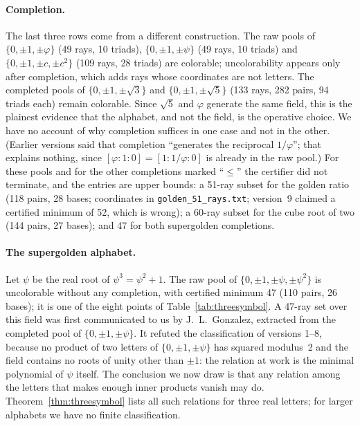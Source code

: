 \paragraph{Completion.}  The last three rows come from a different construction.  The raw pools
of $\{0,\pm1,\pm\varphi\}$ (49 rays, 10 triads), $\{0,\pm1,\pm\psi\}$ (49 rays, 10 triads) and
$\{0,\pm1,\pm c,\pm c^2\}$ (109 rays, 28 triads) are colorable; uncolorability appears only
after completion, which adds rays whose coordinates are not letters.  The completed pools of
$\{0,\pm1,\pm\sqrt3\}$ and $\{0,\pm1,\pm\sqrt5\}$ (133 rays, 282 pairs, 94 triads each) remain
colorable.  Since $\sqrt5$ and $\varphi$ generate the same field, this is the plainest evidence
that the alphabet, and not the field, is the operative choice.  We have no account of why
completion suffices in one case and not in the other.  (Earlier versions said that completion
``generates the reciprocal $1/\varphi$''; that explains nothing, since
$[\varphi:1:0]=[1:1/\varphi:0]$ is already in the raw pool.)  For these pools and for the other
completions marked ``$\le$'' the certifier did not terminate, and the entries are upper bounds:
a 51-ray subset for the golden ratio (118 pairs, 28 bases; coordinates in
\texttt{golden\_51\_rays.txt}; version~9 claimed a certified minimum of 52, which is wrong); a
60-ray subset for the cube root of two (144 pairs, 27 bases); and 47 for both supergolden
completions.

\paragraph{The supergolden alphabet.}  Let $\psi$ be the real root of $\psi^3=\psi^2+1$.  The
raw pool of $\{0,\pm1,\pm\psi,\pm\psi^2\}$ is uncolorable without any completion, with certified
minimum 47 (110 pairs, 26 bases); it is one of the eight points of Table~\ref{tab:threesymbol}.
A 47-ray set over this field was first communicated to us by J.~L.~Gonzalez, extracted from the
completed pool of $\{0,\pm1,\pm\psi\}$.  It refuted the classification of versions 1--8, because
no product of two letters of $\{0,\pm1,\pm\psi\}$ has squared modulus~2 and the field contains no roots of unity other
than $\pm1$: the relation at work is the minimal polynomial of $\psi$ itself.  The conclusion we
now draw is that any relation among the letters that makes enough inner products vanish may do.
Theorem~\ref{thm:threesymbol} lists all such relations for three real letters; for larger
alphabets we have no finite classification.

